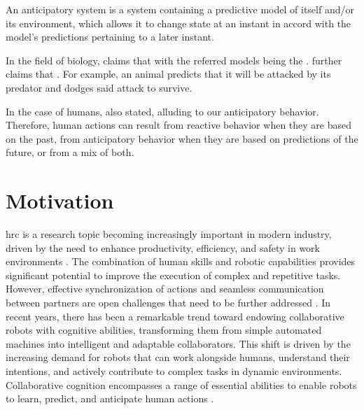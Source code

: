 \begin{displayquote}
An anticipatory system is a system containing a predictive model of itself and/or its environment, which allows it to change state at an instant in accord with the model's predictions pertaining to a later instant.
\end{displayquote}

In the field of biology, \textcite{Louie2010} claims that  with the referred models being the . \textcite{Poli2010} further claims that . For example, an animal predicts that it will be attacked by its predator and dodges said attack to survive.

In the case of humans, \textcite{Louie2010} also stated,  alluding to our anticipatory behavior. Therefore, human actions can result from reactive behavior when they are based on the past, from anticipatory behavior when they are based on predictions of the future, or from a mix of both.


\section{Motivation}

\acl{hrc} is a research topic becoming increasingly important in modern industry, driven by the need to enhance productivity, efficiency, and safety in work environments \cite{RoblaGomez2017,Villani2018,Ajoudani2018,Matheson2019,Kumar2021,Castro2021}. The combination of human skills and robotic capabilities provides significant potential to improve the execution of complex and repetitive tasks. However, effective synchronization of actions and seamless communication between partners are open challenges that need to be further addressed \cite{Michalos2018,Papanastasiou2019,Hoffman2019}. In recent years, there has been a remarkable trend toward endowing collaborative robots with cognitive abilities, transforming them from simple automated machines into intelligent and adaptable collaborators. This shift is driven by the increasing demand for robots that can work alongside humans, understand their intentions, and actively contribute to complex tasks in dynamic environments. Collaborative cognition encompasses a range of essential abilities to enable robots to learn, predict, and anticipate human actions \cite{Rozo2018,Jiao2020,Castro2021}. 

